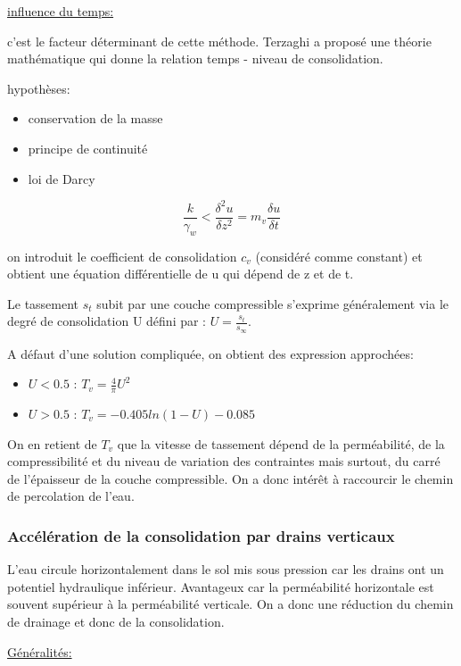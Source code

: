 \underline{influence du temps:} 

c'est le facteur déterminant de cette méthode. Terzaghi a proposé une théorie mathématique qui donne la relation temps - niveau de consolidation.

hypothèses:
\begin{itemize}
    \item conservation de la masse
    \item principe de continuité
    \item loi de Darcy
\end{itemize} 

\medskip

$$ \frac{k}{\gamma_w}<\frac{\delta^2 u}{\delta z^2} = m_v \frac{\delta u}{\delta t} $$

on introduit le coefficient de consolidation $c_v$ (considéré comme constant) et obtient une équation différentielle de u qui dépend de z et de t.

Le tassement $s_t$ subit par une couche compressible s'exprime généralement via le degré de consolidation U défini par : $U=\frac{s_t}{s_\infty}$.

A défaut d'une solution compliquée, on obtient des expression approchées: 

\begin{itemize}
    \item $U<0.5$ : $T_v = \frac{4}{\pi} U^2$
    \item $U>0.5$ : $T_v = -0.405 ln(1-U) - 0.085$
\end{itemize} 

\medskip

On en retient de $T_v$ que la vitesse de tassement dépend de la perméabilité, de la compressibilité et du niveau de variation des contraintes mais surtout, du carré de l'épaisseur de la couche compressible. On a donc intérêt à raccourcir le chemin de percolation de l'eau.

\subsubsection{Accélération de la consolidation par drains verticaux}

L'eau circule horizontalement dans le sol mis sous pression car les drains ont un potentiel hydraulique inférieur. Avantageux car la perméabilité horizontale est souvent supérieur à la perméabilité verticale. On a donc une réduction du chemin de drainage et donc de la consolidation. 

\underline{Généralités:} 

